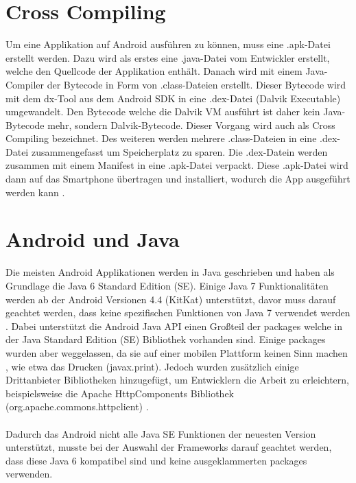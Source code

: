\section{Cross Compiling}
Um eine Applikation auf Android ausführen zu können, muss eine .apk-Datei erstellt werden. Dazu wird als erstes eine .java-Datei vom Entwickler erstellt, welche den Quellcode der Applikation enthält. Danach wird mit einem Java-Compiler der Bytecode in Form von .class-Dateien erstellt. Dieser Bytecode wird mit dem dx-Tool aus dem Android SDK in eine .dex-Datei (Dalvik Executable) umgewandelt. Den Bytecode welche die Dalvik VM ausführt ist daher kein Java-Bytecode mehr, sondern Dalvik-Bytecode. Dieser Vorgang wird auch als Cross Compiling bezeichnet. Des weiteren werden mehrere .class-Dateien in eine .dex-Datei zusammengefasst um Speicherplatz zu sparen. Die .dex-Datein werden zusammen mit einem Manifest in eine .apk-Datei verpackt. Diese .apk-Datei wird dann auf das Smartphone übertragen und installiert, wodurch die App ausgeführt werden kann \cite{unterschied:dirscherl}.	

\section{Android und Java}
Die meisten Android Applikationen werden in Java geschrieben und haben als Grundlage die Java 6 Standard Edition (SE). Einige Java 7 Funktionalitäten werden ab der Android Versionen 4.4 (KitKat) unterstützt, davor muss darauf geachtet werden, dass keine spezifischen Funktionen von Java 7 verwendet werden \cite{android:burnette}. Dabei unterstützt die Android Java API einen Großteil der packages welche in der Java Standard Edition (SE) Bibliothek vorhanden sind. Einige packages wurden aber weggelassen, da sie auf einer mobilen Plattform keinen Sinn machen \cite{implemenationSDK}, wie etwa das Drucken (javax.print). Jedoch wurden zusätzlich einige Drittanbieter Bibliotheken hinzugefügt, um Entwicklern die Arbeit zu erleichtern, beispielsweise die Apache HttpComponents Bibliothek (org.apache.commons.httpclient) \cite{android:libs}. 
\\\\	
Dadurch das Android nicht alle Java SE Funktionen der neuesten Version unterstützt, musste bei der Auswahl der Frameworks darauf geachtet werden, dass diese Java 6 kompatibel sind und keine ausgeklammerten packages verwenden.	


